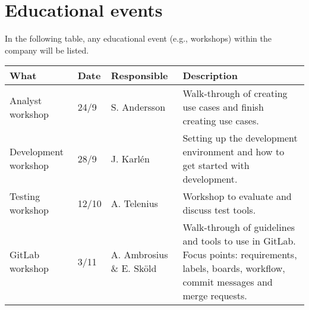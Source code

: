 \section{Educational events}
\label{sec:edu}
In the following table, any educational event (e.g., workshops) within the company will be listed.

\begingroup
\begin{table}[ht]
    \renewcommand{\arraystretch}{1.5}
        \begin{tabular}{|M{3.5cm}|M{1cm}|M{2.5cm}|M{6cm}|}
        \hline
        \textbf{What} & \textbf{Date} & \textbf{Responsible} & \textbf{Description} \\
        \hline
        Analyst workshop & 24/9 & S. Andersson & Walk-through of creating use cases and finish creating use cases.\\
        \hline
         Development workshop & 28/9 & J. Karlén & Setting up the development environment and how to get started with development. \\
        \hline
         Testing workshop & 12/10 & A. Telenius & Workshop to evaluate and discuss test tools.\\
        \hline
         GitLab workshop & 3/11  & A. Ambrosius \& E. Sköld & Walk-through of guidelines and tools to use in GitLab. Focus points: requirements, labels, boards, workflow, commit messages and merge requests.\\
        \hline
        \end{tabular}
\end{table}

\endgroup
